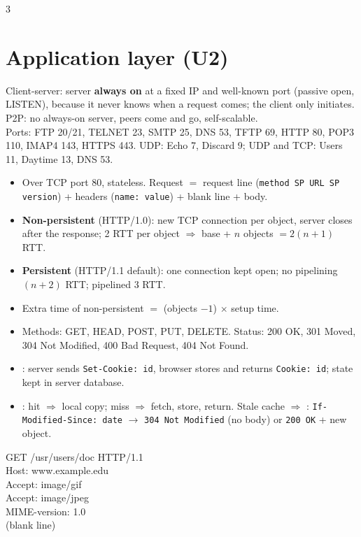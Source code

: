 \begin{multicols*}{3}
\section*{Application layer (U2)}

 
Client-server: server \textbf{always on} at a fixed IP and well-known port (passive open, LISTEN), because it never knows when a request comes; the client only initiates. P2P: no always-on server, peers come and go, self-scalable.\\
Ports: FTP 20/21, TELNET 23, SMTP 25, DNS 53, TFTP 69, HTTP 80, POP3 110, IMAP4 143, HTTPS 443. UDP: Echo 7, Discard 9; UDP and TCP: Users 11, Daytime 13, DNS 53.

 
\begin{itemize}
  \item Over TCP port 80, stateless. Request $=$ request line (\texttt{method SP URL SP version}) + headers (\texttt{name: value}) + blank line + body.
  \item \textbf{Non-persistent} (HTTP/1.0): new TCP connection per object, server closes after the response; 2 RTT per object $\Rightarrow$ base + $n$ objects $=2(n{+}1)$ RTT.
  \item \textbf{Persistent} (HTTP/1.1 default): one connection kept open; no pipelining $(n{+}2)$ RTT; pipelined 3 RTT.
  \item Extra time of non-persistent $=$ (objects $-1$) $\times$ setup time.
  \item Methods: GET, HEAD, POST, PUT, DELETE. Status: 200 OK, 301 Moved, 304 Not Modified, 400 Bad Request, 404 Not Found.
  \item {}: server sends \texttt{Set-Cookie: id}, browser stores and returns \texttt{Cookie: id}; state kept in server database.
  \item {}: hit $\Rightarrow$ local copy; miss $\Rightarrow$ fetch, store, return. Stale cache $\Rightarrow$ : \texttt{If-Modified-Since: date} $\to$ \texttt{304 Not Modified} (no body) or \texttt{200 OK} + new object.
\end{itemize}
{\ttfamily\scriptsize GET /usr/users/doc HTTP/1.1\\ Host: www.example.edu\\ Accept: image/gif\\ Accept: image/jpeg\\ MIME-version: 1.0\\ (blank line)}


\end{multicols*}
